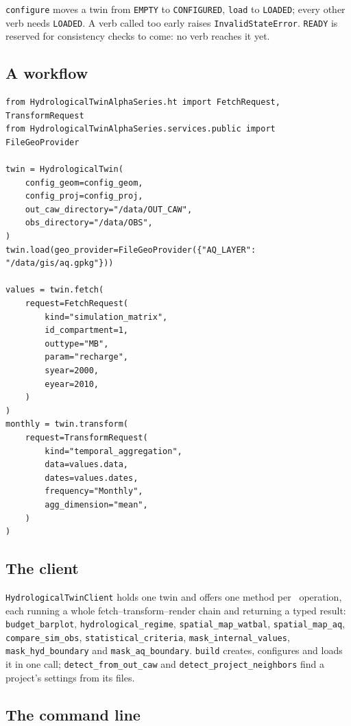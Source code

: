 \texttt{configure} moves a twin from \texttt{EMPTY} to \texttt{CONFIGURED},
\texttt{load} to \texttt{LOADED}; every other verb needs \texttt{LOADED}. A verb
called too early raises \texttt{InvalidStateError}. \texttt{READY} is reserved
for consistency checks to come: no verb reaches it yet.

\subsection{A workflow}

\begin{verbatim}
from HydrologicalTwinAlphaSeries.ht import FetchRequest, TransformRequest
from HydrologicalTwinAlphaSeries.services.public import FileGeoProvider

twin = HydrologicalTwin(
    config_geom=config_geom,
    config_proj=config_proj,
    out_caw_directory="/data/OUT_CAW",
    obs_directory="/data/OBS",
)
twin.load(geo_provider=FileGeoProvider({"AQ_LAYER": "/data/gis/aq.gpkg"}))

values = twin.fetch(
    request=FetchRequest(
        kind="simulation_matrix",
        id_compartment=1,
        outtype="MB",
        param="recharge",
        syear=2000,
        eyear=2010,
    )
)
monthly = twin.transform(
    request=TransformRequest(
        kind="temporal_aggregation",
        data=values.data,
        dates=values.dates,
        frequency="Monthly",
        agg_dimension="mean",
    )
)
\end{verbatim}

\subsection{The client}

\texttt{HydrologicalTwinClient} holds one twin and offers one method per \cwv\
operation, each running a whole fetch--transform--render chain and returning a
typed result: \texttt{budget\_barplot}, \texttt{hydrological\_regime},
\texttt{spatial\_map\_watbal}, \texttt{spatial\_map\_aq},
\texttt{compare\_sim\_obs}, \texttt{statistical\_criteria},
\texttt{mask\_internal\_values}, \texttt{mask\_hyd\_boundary} and
\texttt{mask\_aq\_boundary}. \texttt{build} creates, configures and loads it
in one call; \texttt{detect\_from\_out\_caw} and
\texttt{detect\_project\_neighbors} find a project's settings from its files.

\subsection{The command line}

